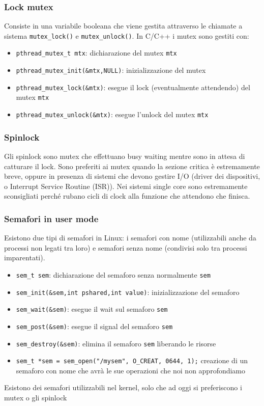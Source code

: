 \documentclass[a4paper]{article}
\begin{document}
\subsubsection*{Lock mutex}
Consiste in una variabile booleana che viene gestita attraverso le chiamate a sistema \verb|mutex_lock()| e \verb|mutex_unlock()|.
In C/C++ i mutex sono gestiti con:
\begin{itemize}
	\item \verb|pthread_mutex_t mtx|: dichiarazione del mutex \verb|mtx|
	\item \verb|pthread_mutex_init(&mtx,NULL)|: inizializzazione del mutex
	\item \verb|pthread_mutex_lock(&mtx)|: esegue il lock (eventualmente attendendo) del mutex \verb|mtx|
	\item \verb|pthread_mutex_unlock(&mtx)|: esegue l'unlock del mutex \verb|mtx|
\end{itemize}

\subsubsection*{Spinlock}
Gli spinlock sono mutex che effettuano busy waiting mentre sono in attesa di catturare il lock. Sono preferiti ai mutex quando la
sezione critica è estremamente breve, oppure in presenza di sistemi che devono gestire I/O (driver dei dispositivi, o Interrupt
Service Routine (ISR)). Nei sistemi single core sono estremamente sconsigliati perché rubano cicli di clock alla funzione che
attendono che finisca.

\subsubsection*{Semafori in user mode}
Esistono due tipi di semafori in Linux: i semafori con nome (utilizzabili anche da processi non legati tra loro) e semafori senza
nome (condivisi solo tra processi imparentati).
\begin{itemize}
	\item \verb|sem_t sem|: dichiarazione del semaforo senza normalmente \verb|sem|
	\item \verb|sem_init(&sem,int pshared,int value)|: inizializzazione del semaforo
	\item \verb|sem_wait(&sem)|: esegue il wait sul semaforo \verb|sem|
	\item \verb|sem_post(&sem)|: esegue il signal del semaforo \verb|sem|
	\item \verb|sem_destroy(&sem)|: elimina il semaforo \verb|sem| liberando le risorse
	\item \verb|sem_t *sem = sem_open("/mysem", O_CREAT, 0644, 1);| creazione di un semaforo con nome che avrà le sue operazioni
	che noi non approfondiamo
\end{itemize}
Esistono dei semafori utilizzabili nel kernel, solo che ad oggi si preferiscono i mutex o gli spinlock
\end{document}
